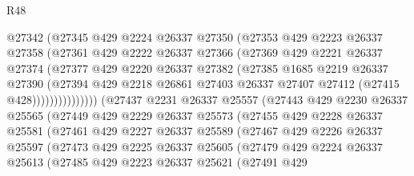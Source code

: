 \begin{lexlean}{R48}
\begin{coremodule}
                      @27342
                      (@27345
                        @429
                        @2224
                        @26337
                        @27350
                        (@27353
                          @429
                          @2223
                          @26337
                          @27358
                          (@27361
                            @429
                            @2222
                            @26337
                            @27366
                            (@27369
                              @429
                              @2221
                              @26337
                              @27374
                              (@27377
                                @429
                                @2220
                                @26337
                                @27382
                                (@27385
                                  @1685
                                  @2219
                                  @26337
                                  @27390
                                  (@27394
                                    @429
                                    @2218
                                    @26861
                                    @27403
                                    @26337
                                    @27407
                                    @27412
                                    (@27415 @428)))))))))))))))
        (@27437
          @2231
          @26337
          @25557
          (@27443
            @429
            @2230
            @26337
            @25565
            (@27449
              @429
              @2229
              @26337
              @25573
              (@27455
                @429
                @2228
                @26337
                @25581
                (@27461
                  @429
                  @2227
                  @26337
                  @25589
                  (@27467
                    @429
                    @2226
                    @26337
                    @25597
                    (@27473
                      @429
                      @2225
                      @26337
                      @25605
                      (@27479
                        @429
                        @2224
                        @26337
                        @25613
                        (@27485
                          @429
                          @2223
                          @26337
                          @25621
                          (@27491
                            @429

\end{coremodule}
\end{lexlean}
